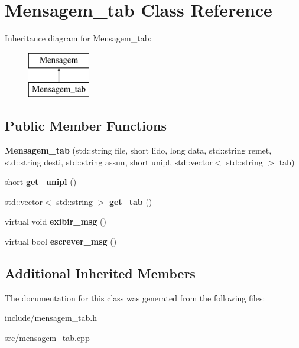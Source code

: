 \hypertarget{class_mensagem__tab}{}\section{Mensagem\+\_\+tab Class Reference}
\label{class_mensagem__tab}
Inheritance diagram for Mensagem\+\_\+tab\+:\begin{figure}[H]
\begin{center}
\leavevmode
\includegraphics[height=2.000000cm]{class_mensagem__tab}
\end{center}
\end{figure}
\subsection*{Public Member Functions}
\begin{DoxyCompactItemize}
\item 
\mbox{\label{class_mensagem__tab_a0b75a1aa7c8385761071250ff3c3b272}} 
{\bfseries Mensagem\+\_\+tab} (std\+::string file, short lido, long data, std\+::string remet, std\+::string desti, std\+::string assun, short unipl, std\+::vector$<$ std\+::string $>$ tab)
\item 
\mbox{\label{class_mensagem__tab_a61f579d8c2a22d1b581d42be91a31035}} 
short {\bfseries get\+\_\+unipl} ()
\item 
\mbox{\label{class_mensagem__tab_a7d1edb73726312c21e3a8a0986bc9e2b}} 
std\+::vector$<$ std\+::string $>$ {\bfseries get\+\_\+tab} ()
\item 
\mbox{\label{class_mensagem__tab_a0b9fdf5ca4ab5cc236343b58f5db62db}} 
virtual void {\bfseries exibir\+\_\+msg} ()
\item 
\mbox{\label{class_mensagem__tab_a9e7f645d2eb95b14a676edec5f21dcf7}} 
virtual bool {\bfseries escrever\+\_\+msg} ()
\end{DoxyCompactItemize}
\subsection*{Additional Inherited Members}


The documentation for this class was generated from the following files\+:\begin{DoxyCompactItemize}
\item 
include/mensagem\+\_\+tab.\+h\item 
src/mensagem\+\_\+tab.\+cpp\end{DoxyCompactItemize}
